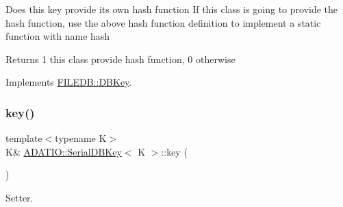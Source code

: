 Does this key provide its own hash function If this class is going to provide the hash function, use the above hash function definition to implement a static function with name hash

\begin{DoxyReturn}{Returns}
1 this class provide hash function, 0 otherwise 
\end{DoxyReturn}


Implements \mbox{\hyperlink{classFILEDB_1_1DBKey_a541dab4f4083ae951dee2f30483eb18e}{F\+I\+L\+E\+D\+B\+::\+D\+B\+Key}}.

\mbox{\label{classADATIO_1_1SerialDBKey_a9dc566bd8bc83d98d4438d220012648a}} 
\subsubsection{\texorpdfstring{key()}{key()}\hspace{0.1cm}{\footnotesize\ttfamily [1/4]}}
{\footnotesize\ttfamily template$<$typename K$>$ \\
K\& \mbox{\hyperlink{classADATIO_1_1SerialDBKey}{A\+D\+A\+T\+I\+O\+::\+Serial\+D\+B\+Key}}$<$ K $>$\+::key (\begin{DoxyParamCaption}{ }\end{DoxyParamCaption})\hspace{0.3cm}{\ttfamily [inline]}}



Setter. 

